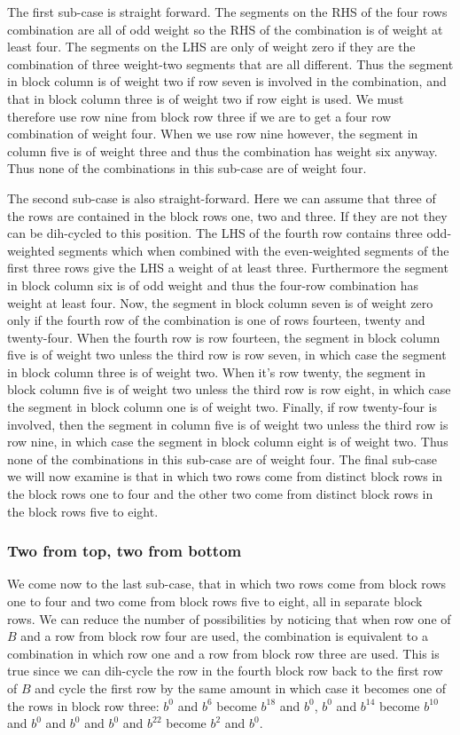 The first sub-case is straight forward.
The segments on the RHS of the four rows combination are all of odd weight so the RHS of the combination is of weight at least four.
The segments on the LHS are only of weight zero if they are the combination of three weight-two segments that are all different.
Thus the segment in block column is of weight two if row seven is involved in the combination, and that in block column three is of weight two if row eight is used.
We must therefore use row nine from block row three if we are to get a four row combination of weight four.
When we use row nine however, the segment in column five is of weight three and thus the combination has weight six anyway.
Thus none of the combinations in this sub-case are of weight four.

The second sub-case is also straight-forward.
Here we can assume that three of the rows are contained in the block rows one, two and three.
If they are not they can be dih-cycled to this position.
The LHS of the fourth row contains three odd-weighted segments which when combined with the even-weighted segments of the first three rows give the LHS a weight of at least three.
Furthermore the segment in block column six is of odd weight and thus the four-row combination has weight at least four.
Now, the segment in block column seven is of weight zero only if the fourth row of the combination is one of rows fourteen, twenty and twenty-four.
When the fourth row is row fourteen, the segment in block column five is of weight two unless the third row is row seven, in which case the segment in block column three is of weight two.
When it's row twenty, the segment in block column five is of weight two unless the third row is row eight, in which case the segment in block column one is of weight two.
Finally, if row twenty-four is involved, then the segment in column five is of weight two unless the third row is row nine, in which case the segment in block column eight is of weight two.
Thus none of the combinations in this sub-case are of weight four.
The final sub-case we will now examine is that in which two rows come from distinct block rows in the block rows one to four and the other two come from distinct block rows in the block rows five to eight.

\subsubsection{Two from top, two from bottom}
We come now to the last sub-case, that in which two rows come from block rows one to four and two come from block rows five to eight, all in separate block rows.
We can reduce the number of possibilities by noticing that when row one of $B$ and a row from block row four are used, the combination is equivalent to a combination in which row one and a row from block row three are used.
This is true since we can dih-cycle the row in the fourth block row back to the first row of $B$ and cycle the first row by the same amount in which case it becomes one of the rows in block row three: $b^0$ and $b^6$ become $b^{18}$ and $b^0$, $b^0$ and $b^{14}$ become $b^{10}$ and $b^0$ and $b^0$ and $b^0$ and $b^{22}$ become $b^2$ and $b^0$.

